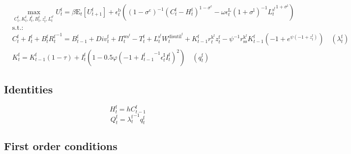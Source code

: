 \begin{align}
&\max_{C^{\mathrm{f}}_{t}, K^{\mathrm{f}}_{t}, I^{\mathrm{f}}_{t}, B^{\mathrm{f}}_{t}, z^{\mathrm{f}}_{t}, L^{\mathrm{s}^{\mathrm{f}}}_{t}
} U^{\mathrm{f}}_{t} = {\beta} {\mathrm{E}_{t}\left[U^{\mathrm{f}}_{t+1}\right]} + {\epsilon^{\mathrm{b}}_{t}} \left(\left(1 - \sigma^{\mathrm{c}}\right)^{-1} {\left(C^{\mathrm{f}}_{t} - H^{\mathrm{f}}_{t}\right)^{1 - \sigma^{\mathrm{c}}}} - {\omega} {\epsilon^{\mathrm{L}}_{t}} \left(1 + \sigma^{\mathrm{l}}\right)^{-1} {{L^{\mathrm{s}^{\mathrm{f}}}_{t}}^{1 + \sigma^{\mathrm{l}}}}\right)\\
&\mathrm{s.t.:}\nonumber\\
& C^{\mathrm{f}}_{t} + I^{\mathrm{f}}_{t} + {B^{\mathrm{f}}_{t}} {R^{\mathrm{f}}_{t}}^{-1} = B^{\mathrm{f}}_{t-1} + {D\!i\!v}^{\mathrm{f}}_{t} + \Pi^{\mathrm{ws}^{\mathrm{f}}}_{t} - T^{\mathrm{f}}_{t} + {L^{\mathrm{s}^{\mathrm{f}}}_{t}} {W^{\mathrm{disutil}^{\mathrm{f}}}_{t}} + {K^{\mathrm{f}}_{t-1}} {r^{\mathrm{k}^{\mathrm{f}}}_{t}} {z^{\mathrm{f}}_{t}} - {\psi}^{-1} {r^{\mathrm{k}^{\mathrm{f}}}_\mathrm{ss}} {K^{\mathrm{f}}_{t-1}} \left(-1 + e^{{\psi} \left(-1 + z^{\mathrm{f}}_{t}\right)}\right) \quad \left(\lambda^{\mathrm{f}}_{t}\right)\\
& K^{\mathrm{f}}_{t} = {K^{\mathrm{f}}_{t-1}} \left(1 - \tau\right) + {I^{\mathrm{f}}_{t}} \left(1 - 0.5{\varphi} \left(-1 + {I^{\mathrm{f}}_{t-1}}^{-1} {\epsilon^{\mathrm{I}}_{t}} {I^{\mathrm{f}}_{t}}\right)^{2}\right) \quad \left(q^{\mathrm{f}}_{t}\right)
\end{align}


\subsection{Identities}

\begin{equation}
H^{\mathrm{f}}_{t} = {h} {C^{\mathrm{f}}_{t-1}}
\end{equation}
\begin{equation}
Q^{\mathrm{f}}_{t} = {\lambda^{\mathrm{f}}_{t}}^{-1} {q^{\mathrm{f}}_{t}}
\end{equation}


\subsection{First order conditions}

